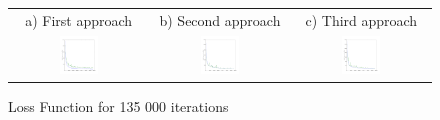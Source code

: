 \begin{figure}[htb]
\centering
\begin{tabular}{ccc}
    a) First approach & b) Second approach & c) Third approach \\
    \includegraphics[width=0.3\textwidth]{images/regression/test_loss_26_135000}&
    \includegraphics[width=0.3\textwidth]{images/regression/test_loss_37_135000}&
    \includegraphics[width=0.3\textwidth]{images/regression/test_loss_30_135000}\\
\end{tabular}
\caption{Loss Function for 135 000 iterations}
\label{1apploss}
\label{2apploss}
\label{3apploss}
\end{figure}

